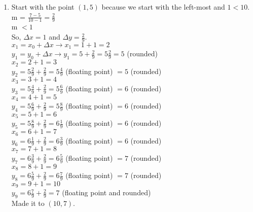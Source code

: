 \documentclass[12pt]{article}
\begin{document}
\begin{enumerate}
\item
Start with the point $(1, 5)$ because we start with the left-most and $1 < 10$. \\
m = $\frac{7-5}{10-1} = \frac{2}{9}$ \\
m $< 1$ \\
So, $\Delta x = 1$ and $\Delta y = \frac{2}{9}$. \\
$x_1 = x_0 + \Delta x \rightarrow x_1 = 1 + 1 = 2$ \\
$y_1 = y_0 + \Delta x \rightarrow y_1 = 5 + \frac{2}{9} = 5\frac{2}{9} = 5$ (rounded) \\
$x_2 = 2 + 1 = 3$ \\
$y_2 = 5\frac{2}{9} + \frac{2}{9} = 5\frac{4}{9}$ (floating point) $= 5$ (rounded) \\
$x_3 = 3 + 1 = 4$ \\
$y_3 = 5\frac{4}{9} + \frac{2}{9} = 5\frac{6}{9}$ (floating point) $= 6$ (rounded) \\
$x_4 = 4 + 1 = 5$ \\
$y_4 = 5\frac{6}{9} + \frac{2}{9} = 5\frac{8}{9}$ (floating point) $= 6$ (rounded) \\
$x_5 = 5 + 1 = 6$ \\
$y_5 = 5\frac{8}{9} + \frac{2}{9} = 6\frac{1}{9}$ (floating point) $= 6$ (rounded) \\
$x_6 = 6 + 1 = 7$ \\
$y_6 = 6\frac{1}{9} + \frac{2}{9} = 6\frac{3}{9}$ (floating point) $= 6$ (rounded) \\
$x_7 = 7 + 1 = 8$ \\
$y_7 = 6\frac{3}{9} + \frac{2}{9} = 6\frac{5}{9}$ (floating point) $= 7$ (rounded) \\
$x_8 = 8 + 1 = 9$ \\
$y_8 = 6\frac{5}{9} + \frac{2}{9} = 6\frac{7}{9}$ (floating point) $= 7$ (rounded) \\
$x_9 = 9 + 1 = 10$ \\
$y_9 = 6\frac{7}{9} + \frac{2}{9} = 7$ (floating point and rounded)  \\
Made it to $(10, 7)$.



\end{enumerate}
\end{document}
